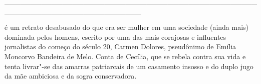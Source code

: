 \hspace*{-2cm}\_\_\_\_\_\_\_\_\_\_\_\_\_\_\_\_\_\_\_\_\_\_\_\_\_\_\_\_\_\_\_\_\_\_\_\_\_\_\_\_\_\_\_\_\_\_\_\_\_\_\_\_\_\_\_\_\_\_\_\_\_\_\_\_\_\_\_\_\_\_\_\_\_\_

\medskip

 é um retrato desabusado do que era ser mulher em uma sociedade (ainda mais) dominada pelos homens, escrito por uma das mais corajosas e influentes jornalistas do começo do século 20, Carmen Dolores, pseudônimo de Emília Moncorvo Bandeira de Melo. Conta de Cecília, que se rebela contra sua vida e tenta livrar"-se das amarras patriarcais de um casamento insosso e do duplo jugo da mãe ambiciosa e da sogra conservadora.

\hspace{.5cm}

\hspace*{-.4cm}\begin{minipage}[c]{0.45\linewidth}
\small{
{}}
\end{minipage}

\pagebreak


